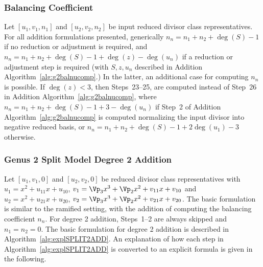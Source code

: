 \subsubsection{Balancing Coefficient}\label{sec:expladd} Let $[u_1,v_1,n_1]$ and
$[u_2,v_2,n_2]$ be input reduced divisor class representatives. For all addition
formulations presented, generically $n_n = n_1 + n_2 + \deg(S) - 1$ if no
reduction or adjustment is required, and $n_n = n_1 + n_2 + \deg(S) - 1 +
\deg(z) - \deg(u_n)$ if a reduction or adjustment step is required (with
$S,z,u_n$ described in Addition Algorithm~\ref{alg:g2balnucomp}.) In the latter,
an additional case for computing $n_n$ is possible. If $\deg(z) < 3$, then
Steps~23--25, are computed instead of Step~26 in Addition
Algorithm~\ref{alg:g2balnucomp}, where $n_n = n_1 + n_2 + \deg(S) - 1 + 3 -
\deg(u_n)$ if Step~2 of Addition Algorithm~\ref{alg:g2balnucomp} is computed
normalizing the input divisor into negative reduced basis, or $n_n = n_1 + n_2 +
\deg(S) - 1 + 2\deg(u_1) - 3$ otherwise.

\subsubsection{Genus 2 Split Model Degree 2 Addition}
Let $[u_1,v_1,0]$ and $[u_2,v_2,0]$ be reduced divisor class representatives
with $u_1 = x^2 + u_{11}x + u_{10}$, $v_1 = \Vp_3x^3 + \Vp_2x^2 + v_{11}x +
v_{10}$ and $u_2 = x^2 + u_{21}x + u_{20}$, $v_2 = \Vp_3x^3 + \Vp_2x^2 + v_{21}x
+ v_{20}$. The basic formulation is similar to the ramified setting, with the 
addition of computing the balancing coefficient $n_n$. For degree 2 addition,
Steps~1--2 are always skipped and $n_1 = n_2 = 0$. The basic formulation for
degree 2 addition is described in Algorithm~\ref{alg:explSPLIT2ADD}. An
explanation of how each step in Algorithm~\ref{alg:explSPLIT2ADD} is converted
to an explicit formula is given in the following.


